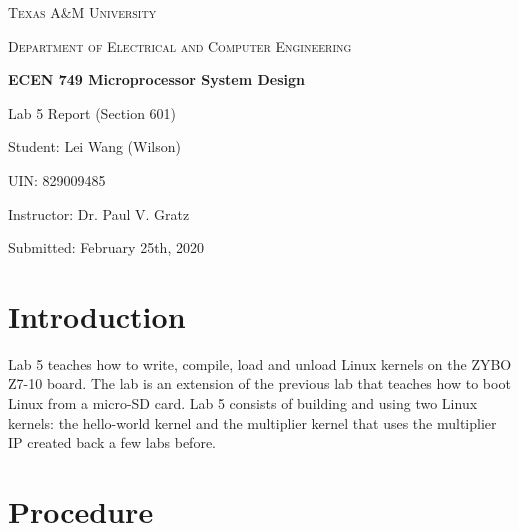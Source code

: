 \documentclass[11pt,letterpaper,titlepage]{article}
\begin{document}
\begin{titlepage}
  \centering
	{\scshape\large Texas A\&M University \par}
	\vspace{1cm}
	{\scshape\Large Department of Electrical and Computer Engineering \par}
	\vspace{4cm}
    \vspace{0.5cm}
	{\huge\bfseries ECEN 749 Microprocessor System Design\par}
	\vspace{4cm}
	{\Large Lab 5 Report (Section 601)\par}
	\vspace{1cm}
	{\Large Student: Lei Wang (Wilson)\par}
	\vspace{1cm}
	{\Large UIN: 829009485\par}
	\vspace{1cm}
	{\Large Instructor: Dr. Paul V. Gratz\par}
	\vspace{4cm}
	\vfill

	{\large Submitted: February 25th, 2020 \par}

\end{titlepage}

\newpage

\tableofcontents{}

\newpage

\part{Introduction}

Lab 5 teaches how to write, compile, load and unload Linux kernels on the ZYBO Z7-10 board. The lab is an extension of the previous lab that teaches how to boot Linux from a micro-SD card. Lab 5 consists of building and using two Linux kernels: the hello-world kernel and the multiplier kernel that uses the multiplier IP created back a few labs before.

\part{Procedure}
\end{document}
